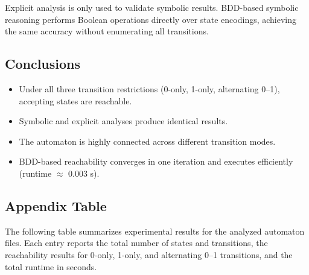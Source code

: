 \documentclass[a4paper,11pt]{article}
\begin{document}
Explicit analysis is only used to validate symbolic results.
BDD-based symbolic reasoning performs Boolean operations directly over state encodings,
achieving the same accuracy without enumerating all transitions.



\subsection*{Conclusions}

\begin{itemize}
  \item Under all three transition restrictions (0-only, 1-only, alternating 0–1),
        accepting states are reachable.
  \item Symbolic and explicit analyses produce identical results.
  \item The automaton is highly connected across different transition modes.
  \item BDD-based reachability converges in one iteration and executes efficiently
        (runtime $\approx$ 0.003 s).
\end{itemize}



\subsection*{Appendix Table}

The following table summarizes experimental results for the analyzed automaton files.
Each entry reports the total number of states and transitions,
the reachability results for 0-only, 1-only, and alternating 0–1 transitions,
and the total runtime in seconds.
\end{document}
